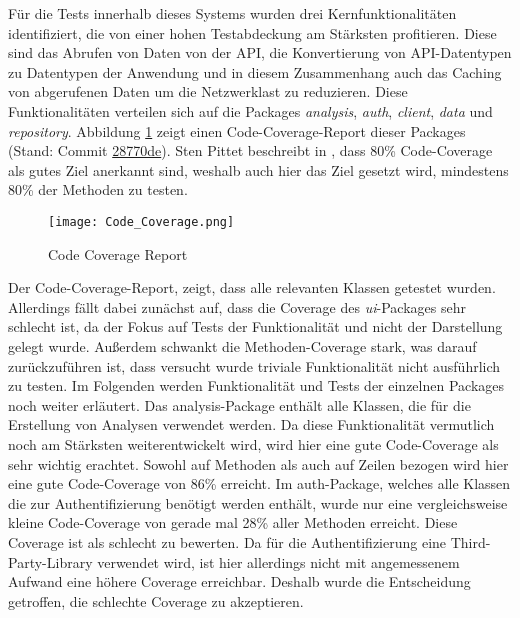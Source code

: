 Für die Tests innerhalb dieses Systems wurden drei Kernfunktionalitäten identifiziert, die von einer hohen Testabdeckung am Stärksten profitieren.
Diese sind das Abrufen von Daten von der API, die Konvertierung von API-Datentypen zu Datentypen der Anwendung und in diesem Zusammenhang auch das Caching von abgerufenen Daten um die Netzwerklast zu reduzieren.
\newline
Diese Funktionalitäten verteilen sich auf die Packages \textit{analysis}, \textit{auth}, \textit{client}, \textit{data} und \textit{repository}.
Abbildung \ref{fig:Code_Coverage} zeigt einen Code-Coverage-Report dieser Packages (Stand: Commit \href{https://github.com/lukaspanni/OpenSourceStats/tree/28770def85a66a72b343e6640f2dbfa8ba073782}{28770de}).
Sten Pittet beschreibt in \cite{pittet_coverage}, dass 80\% Code-Coverage als gutes Ziel anerkannt sind, weshalb auch hier das Ziel gesetzt wird, mindestens 80\% der Methoden zu testen.
\begin{figure}[h]
  \texttt{[image: Code\_Coverage.png]}
  \centering
  \caption{Code Coverage Report}
  \label{fig:Code_Coverage}
\end{figure}
Der Code-Coverage-Report, zeigt, dass alle relevanten Klassen getestet wurden.
Allerdings fällt dabei zunächst auf, dass die Coverage des \textit{ui}-Packages sehr schlecht ist, da der Fokus auf Tests der Funktionalität und nicht der Darstellung gelegt wurde.
Außerdem schwankt die Methoden-Coverage stark, was darauf zurückzuführen ist, dass versucht wurde triviale Funktionalität nicht ausführlich zu testen.
Im Folgenden werden Funktionalität und Tests der einzelnen Packages noch weiter erläutert.
\newline
\newline
Das analysis-Package enthält alle Klassen, die für die Erstellung von Analysen verwendet werden.
Da diese Funktionalität vermutlich noch am Stärksten weiterentwickelt wird, wird hier eine gute Code-Coverage als sehr wichtig erachtet.
Sowohl auf Methoden als auch auf Zeilen bezogen wird hier eine gute Code-Coverage von 86\% erreicht.
\newline
\newline
Im auth-Package, welches alle Klassen die zur Authentifizierung benötigt werden enthält, wurde nur eine vergleichsweise kleine Code-Coverage von gerade mal 28\% aller Methoden erreicht.
Diese Coverage ist als schlecht zu bewerten.
Da für die Authentifizierung eine Third-Party-Library verwendet wird, ist hier allerdings nicht mit angemessenem Aufwand eine höhere Coverage erreichbar.
Deshalb wurde die Entscheidung getroffen, die schlechte Coverage zu akzeptieren.
